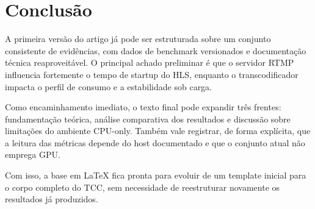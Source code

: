\section{Conclusão}

A primeira versão do artigo já pode ser estruturada sobre um conjunto consistente de evidências, com dados de benchmark versionados e documentação técnica reaproveitável. O principal achado preliminar é que o servidor RTMP influencia fortemente o tempo de startup do HLS, enquanto o transcodificador impacta o perfil de consumo e a estabilidade sob carga.

Como encaminhamento imediato, o texto final pode expandir três frentes: fundamentação teórica, análise comparativa dos resultados e discussão sobre limitações do ambiente CPU-only. Também vale registrar, de forma explícita, que a leitura das métricas depende do host documentado e que o conjunto atual não emprega GPU.

Com isso, a base em LaTeX fica pronta para evoluir de um template inicial para o corpo completo do TCC, sem necessidade de reestruturar novamente os resultados já produzidos.